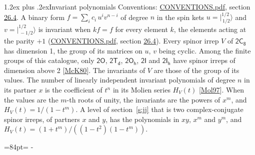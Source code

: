 \documentclass[10pt,a4paper]{article}
\makeatletter
\renewcommand\section{\@startsection{section}{1}{\z@}{-3ex plus -1ex minus -.2ex}%
  {1.2ex plus .2ex}{\normalfont\large\sffamily\bfseries\color{parttitle}}}
\newcommand{\needspace}[1]{\par\penalty-100\begingroup\dimen0=#1\relax\dimen2=\pagegoal
  \advance\dimen2-\pagetotal\ifdim\dimen0>\dimen2\relax\ifdim\dimen2>0pt\vfil\break\fi\fi
  \endgroup}
\numberwithin{equation}{section}
\newcommand{\grp}[1]{\mathsf{#1}}
\newcommand{\jm}[2]{\bigl\lvert{}^{#1}_{\,#2}\bigr\rangle}
\makeatother
\begin{document}
\section{Invariant polynomials}\label{s:invariants}
Conventions: \href{../../CONVENTIONS.pdf}{CONVENTIONS.pdf}, section \href{../../CONVENTIONS.pdf\#conv.26.4}{26.4}.
\leavevmode\label{n:local.binary.form}A binary form $f = \sum_i c_i\, u^i v^{n-i}$ of degree $n$ in the spin kets $u = \jm{1/2}{1/2}$ and $v = \jm{1/2}{-1/2}$ is invariant when $k f = f$ for every element $k$, the elements acting at the parity $+1$ (\href{../../CONVENTIONS.pdf}{CONVENTIONS.pdf}, section \href{../../CONVENTIONS.pdf\#conv.26.4}{26.4}).
\leavevmode\label{n:function.hilbert}Every spinor irrep $V$ of $\grp{2C_{8}}$ has dimension 1, the group of its matrices on $u$, $v$ being cyclic. Among the finite groups of this catalogue, only $\grp{2O}$, $\grp{2T_{d}}$, $\grp{2O_{h}}$, $\grp{2I}$ and $\grp{2I_{h}}$ have spinor irreps of dimension above 2 [\href{../../../REFERENCES.pdf\#ref.McK80}{McK80}]. The invariants of $V$ are those of the group of its values. \label{n:local.partner.x}The number of linearly independent invariant polynomials of degree $n$ in its partner $x$ is the coefficient of $t^n$ in its Molien series $H_V(t)$ [\href{../../../REFERENCES.pdf\#ref.Mol97}{Mol97}]. When the values are the $m$-th roots of unity, the invariants are the powers of $x^{m}$, and $H_V(t) = 1/(1 - t^{m})$. A level of section~\ref{s:jj} that is two complex-conjugate spinor irreps, of partners $x$ and $y$, has the polynomials in $xy$, $x^{m}$ and $y^{m}$, and $H_V(t) = (1 + t^{m})/((1 - t^{2})(1 - t^{m}))$.
\needspace{84pt}
\end{document}
